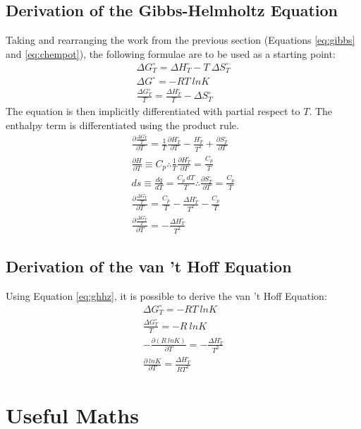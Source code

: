 \documentclass[10pt, oneside, twocolumn]{article}
\numberwithin{equation}{section}
\begin{document}
		\subsection{Derivation of the Gibbs-Helmholtz Equation}
		Taking and rearranging the work from the previous section (Equations \ref{eq:gibbs} and \ref{eq:chempot}), the following formulae are to be used as a starting point:
		\begin{gather}
		\Delta G^\circ_T=\Delta H^\circ_T-T \ \Delta S^\circ_T\\
		\Delta G^\circ=-RT \ lnK\\
		\frac{\Delta G^\circ_T}{T}=\frac{\Delta H^\circ_T}{T}-\Delta S^\circ_T
		\end{gather}
		The equation is then implicitly differentiated with partial respect to $T$. The enthalpy term is differentiated using the product rule.
		\begin{gather}
		\frac{\partial \frac{\Delta G^\circ_T}{T}}{\partial T}=\frac{1}{T}\frac{\partial H^\circ_T}{\partial T}-\frac{H^\circ_T}{T^2}+\frac{\partial S^\circ_T}{\partial T}\\
		\frac{\partial H}{\partial T}\equiv C_p\therefore \frac{1}{T}\frac{\partial H^\circ_T}{\partial T}=\frac{C_p}{T}\\
		ds\equiv\frac{dq}{dT}=\frac{C_p \ dT}{T}\therefore\frac{\partial S^\circ_T}{\partial T}=\frac{C_p}{T}\\
		\frac{\partial \frac{\Delta G^\circ_T}{T}}{\partial T}=\frac{C_p}{T}-\frac{\Delta H^\circ_T}{T^2}-\frac{C_p}{T}\\
		\frac{\partial \frac{\Delta G^\circ_T}{T}}{\partial T}=-\frac{\Delta H^\circ_T}{T^2} \label{eq:ghhz}                                                                  
		\end{gather}
		\subsection{Derivation of the van 't Hoff Equation}
		Using Equation \ref{eq:ghhz}, it is possible to derive the van 't Hoff Equation:
			\begin{gather}
			\Delta G^\circ_T=-RT \ lnK\\
			\frac{\Delta G^\circ_T}{T}=-R \ lnK\\
			-\frac{\partial (R \ lnK)}{\partial T}=-\frac{\Delta H^\circ_T}{T^2}\\
			\frac{\partial \ lnK}{\partial T}=\frac{\Delta H^\circ_T}{RT^2}
			\end{gather}
	\section{Useful Maths}
\end{document}

